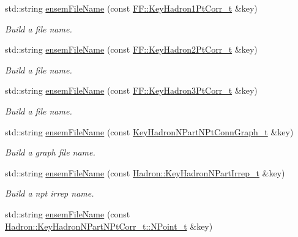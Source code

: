 \begin{DoxyCompactItemize}
std\+::string \mbox{\hyperlink{namespaceHadron_af97a705730e771598736c0ddcec48fea}{ensem\+File\+Name}} (const \mbox{\hyperlink{structFF_1_1KeyHadron1PtCorr__t}{F\+F\+::\+Key\+Hadron1\+Pt\+Corr\+\_\+t}} \&key)
\begin{DoxyCompactList}\small\item\em Build a file name. \end{DoxyCompactList}\item 
std\+::string \mbox{\hyperlink{namespaceHadron_a031dddf6856dd71ac8114cf9c4106268}{ensem\+File\+Name}} (const \mbox{\hyperlink{structFF_1_1KeyHadron2PtCorr__t}{F\+F\+::\+Key\+Hadron2\+Pt\+Corr\+\_\+t}} \&key)
\begin{DoxyCompactList}\small\item\em Build a file name. \end{DoxyCompactList}\item 
std\+::string \mbox{\hyperlink{namespaceHadron_a1043f4c7b4a30f750e2484e69ff0a25b}{ensem\+File\+Name}} (const \mbox{\hyperlink{structFF_1_1KeyHadron3PtCorr__t}{F\+F\+::\+Key\+Hadron3\+Pt\+Corr\+\_\+t}} \&key)
\begin{DoxyCompactList}\small\item\em Build a file name. \end{DoxyCompactList}\item 
std\+::string \mbox{\hyperlink{namespaceHadron_a427c61121d387abc689b090161709921}{ensem\+File\+Name}} (const \mbox{\hyperlink{structHadron_1_1KeyHadronNPartNPtConnGraph__t}{Key\+Hadron\+N\+Part\+N\+Pt\+Conn\+Graph\+\_\+t}} \&key)
\begin{DoxyCompactList}\small\item\em Build a graph file name. \end{DoxyCompactList}\item 
std\+::string \mbox{\hyperlink{namespaceHadron_a21a0c1cea8de6f0c457f10e22cd3d251}{ensem\+File\+Name}} (const \mbox{\hyperlink{structHadron_1_1KeyHadronNPartIrrep__t}{Hadron\+::\+Key\+Hadron\+N\+Part\+Irrep\+\_\+t}} \&key)
\begin{DoxyCompactList}\small\item\em Build a npt irrep name. \end{DoxyCompactList}\item 
std\+::string \mbox{\hyperlink{namespaceHadron_ac1f8513c22ed958fc79537d0cfc00e1f}{ensem\+File\+Name}} (const \mbox{\hyperlink{structHadron_1_1KeyHadronNPartNPtCorr__t_1_1NPoint__t}{Hadron\+::\+Key\+Hadron\+N\+Part\+N\+Pt\+Corr\+\_\+t\+::\+N\+Point\+\_\+t}} \&key)
\item 

\end{DoxyCompactItemize}
